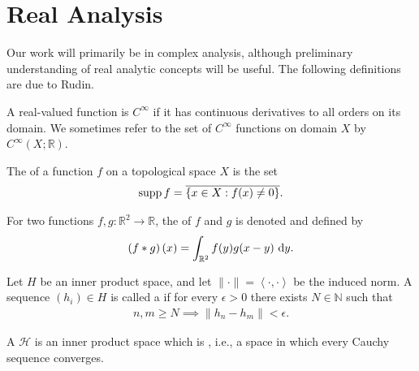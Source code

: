 \section{Real Analysis}
Our work will primarily be in complex analysis, although preliminary
understanding of real analytic concepts will be useful. The following
definitions are due to Rudin.

\begin{definition}[$ C ^{\infty} $]
	A real-valued function is $ C ^{\infty} $ if it has continuous derivatives to
	all orders on its domain. We sometimes refer to the set of $ C ^{\infty} $
	functions on domain $ X $ by $ C ^{\infty}(X;\mathbb{R}) $.
\end{definition}

\begin{definition}[Support]
	The  of a function $ f $ on a topological space $ X $
	is the set
	\begin{align*}
		\operatorname{supp} f = \overline{\left\{ x \in X: f(x) \neq 0 \right\}}.
	\end{align*}
\end{definition}

\begin{definition}[Convolution]
	For two functions $ f,g: \mathbb{R}^{2}\to \mathbb{R} $, the
	 of $ f $ and $ g $ is denoted and defined by
	\begin{align*}
		\left( f * g \right)(x) = \int_{\mathbb{R}^{2}}{f(y)g(x-y)}\operatorname{\, d\!}{y}.
	\end{align*}
\end{definition}

\begin{definition}
	Let $ H $ be an inner product space, and let $ \|\cdot\| = \left\langle \cdot
		, \cdot \right\rangle $ be the induced norm. A sequence $ \left( h_i \right)
		\in H $ is called a  if for every $ \epsilon>0 $
	there exists $ N \in \mathbb{N} $ such that
	\begin{align*}
		n,m \geq N \implies \|h_n - h_m\|<\epsilon.
	\end{align*}
\end{definition}

\begin{definition}
	A  $ \mathcal{H} $ is an inner product space which is
	, i.e., a space in which every Cauchy sequence converges.
\end{definition}

